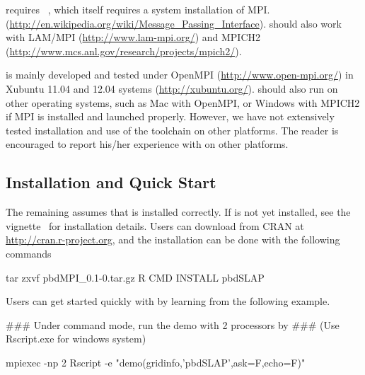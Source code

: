  requires ~\citep{Chen2012pbdMPIpackage}, which
itself requires a system installation of MPI.
(\url{http://en.wikipedia.org/wiki/Message_Passing_Interface}).
 should also
work with LAM/MPI (\url{http://www.lam-mpi.org/}) and
MPICH2 (\url{http://www.mcs.anl.gov/research/projects/mpich2/}).

 is mainly developed and tested under
{\color{blue} OpenMPI} (\url{http://www.open-mpi.org/}) in
Xubuntu 11.04 and 12.04 systems (\url{http://xubuntu.org/}).
 should also run on other operating systems, such as
Mac with OpenMPI, or Windows with MPICH2 if MPI is installed and launched
properly.  However, we have not extensively tested installation and use of
the  toolchain on other platforms. 
The reader is encouraged to report his/her experience with 
on other platforms.


\subsection[Installation and Quick Start]{Installation and Quick Start}
\label{sec:installation}

The remaining assumes that  is installed correctly.
If  is not yet installed, see the 
vignette~\citep{Chen2012pbdMPIvignette} for installation details.
Users can download  from CRAN at
\url{http://cran.r-project.org}, and
the installation can be done with the following commands
\begin{Command}
tar zxvf pbdMPI_0.1-0.tar.gz
R CMD INSTALL pbdSLAP
\end{Command}

Users can get started quickly with  by learning from the
following example.
\begin{Command}
### Under command mode, run the demo with 2 processors by
### (Use Rscript.exe for windows system)

mpiexec -np 2 Rscript -e "demo(gridinfo,'pbdSLAP',ask=F,echo=F)"
\end{Command}

